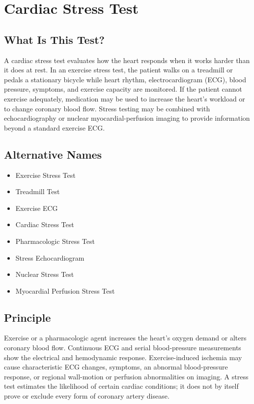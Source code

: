 \chapter{Cardiac Stress Test}

\section*{What Is This Test?}
A cardiac stress test evaluates how the heart responds when it works harder than it does at rest. In an exercise stress test, the patient walks on a treadmill or pedals a stationary bicycle while heart rhythm, electrocardiogram (ECG), blood pressure, symptoms, and exercise capacity are monitored. If the patient cannot exercise adequately, medication may be used to increase the heart's workload or to change coronary blood flow. Stress testing may be combined with echocardiography or nuclear myocardial-perfusion imaging to provide information beyond a standard exercise ECG.

\section*{Alternative Names}
\begin{itemize}
  \item Exercise Stress Test
  \item Treadmill Test
  \item Exercise ECG
  \item Cardiac Stress Test
  \item Pharmacologic Stress Test
  \item Stress Echocardiogram
  \item Nuclear Stress Test
  \item Myocardial Perfusion Stress Test
\end{itemize}
\section*{Principle}
Exercise or a pharmacologic agent increases the heart's oxygen demand or alters coronary blood flow. Continuous ECG and serial blood-pressure measurements show the electrical and hemodynamic response. Exercise-induced ischemia may cause characteristic ECG changes, symptoms, an abnormal blood-pressure response, or regional wall-motion or perfusion abnormalities on imaging. A stress test estimates the likelihood of certain cardiac conditions; it does not by itself prove or exclude every form of coronary artery disease.

